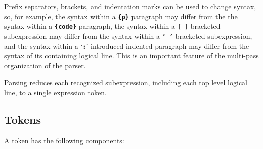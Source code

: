 \documentclass[12pt]{article}
\newcommand{\TT}[1]{{\tt \bfseries #1}}
\begin{document}
Prefix separators, brackets, and indentation marks
can be used to change syntax, so, for example,
the syntax within a \TT{\{p\}} paragraph may differ from the
the syntax within a \TT{\{code\}} paragraph,
the syntax within a \TT{[ ]} bracketed subexpression may differ from
the syntax within a \TT{` '} bracketed subexpression, and
the syntax within a `\TT{:}' introduced indented paragraph may differ
from the syntax of its containing logical line.
This is an important feature of the multi-pass organization of
the parser.

Parsing reduces each recognized subexpression, including each top level
logical line, to a single expression token.

\subsection{Tokens}
\label{TOKENS}

A token has the following components:
\end{document}
